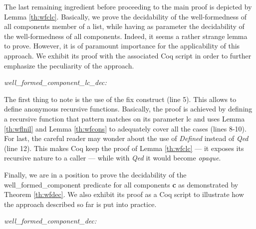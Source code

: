 		 The last remaining ingredient before proceeding to the main proof is
	depicted by Lemma \ref{th:wfclc}. Basically, we prove the decidability of the well-formedness of 
	all \textsf{component}s member of a list, while having as parameter the 
	decidability of the well-formedness of all \textsf{component}s. Indeed, 
	it seems a rather strange lemma to prove. However, it is of paramount 
	importance for the applicability of this approach. 
	We exhibit its proof with the associated Coq script in order
	to further emphasize the peculiarity of the approach. 
					
	\begin{lemma} \label{th:wfclc} \textit{well_formed_component_lc_dec:}
		\vspace{-0.2cm}
		 
		
	\end{lemma}	
	
	\noindent  The first thing to note is the use of the \textsf{fix} construct (line 5). This allows
	to define anonymous recursive functions. Basically, the proof is achieved by defining
	a recursive function that pattern matches on its parameter \textsf{lc} and uses Lemma \ref{th:wflnil}
	and Lemma \ref{th:wfcons} to adequately cover all the cases (lines 8-10). For last, the careful reader may 
	wonder about the use of \textit{Defined} instead of \textit{Qed} (line 12). 
	This makes Coq keep the proof of Lemma \ref{th:wfclc} --- it exposes its 
	recursive nature to a caller --- while with \textit{Qed} it would become 
	\textit{opaque}. 
		
		Finally, we are in a position to prove the decidability of the \textsf{well\_formed\_component}	
	predicate for all \textsf{component}s \textbf{c} as demonstrated by Theorem \ref{th:wfdec}. 
	We also exhibit its proof as a Coq script 
	to illustrate how the approach described so far is put into practice.	
	
	\begin{theorem} \label{th:wfdec} \textit{well_formed_component_dec:}
	\vspace{-0.2cm}
			
	\end{theorem}

